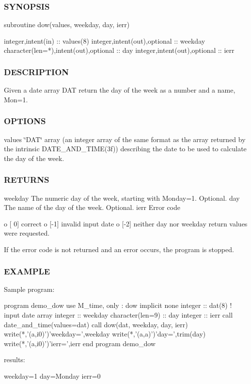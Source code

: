 \subsubsection*{S\+Y\+N\+O\+P\+S\+IS}

\begin{DoxyVerb}subroutine dow(values, weekday, day, ierr)

 integer,intent(in) :: values(8)
 integer,intent(out),optional :: weekday
 character(len=*),intent(out),optional :: day
 integer,intent(out),optional :: ierr
\end{DoxyVerb}


\subsubsection*{D\+E\+S\+C\+R\+I\+P\+T\+I\+ON}

Given a date array D\+AT return the day of the week as a number and a name, Mon=1.

\subsubsection*{O\+P\+T\+I\+O\+NS}

values \char`\"{}\+D\+A\+T\char`\"{} array (an integer array of the same format as the array returned by the intrinsic D\+A\+T\+E\+\_\+\+A\+N\+D\+\_\+\+T\+I\+M\+E(3f)) describing the date to be used to calculate the day of the week. \subsubsection*{R\+E\+T\+U\+R\+NS}

weekday The numeric day of the week, starting with Monday=1. Optional. day The name of the day of the week. Optional. ierr Error code \begin{DoxyVerb}     o [ 0] correct
     o [-1] invalid input date
     o [-2] neither day nor weekday
       return values were requested.

     If the error code is not returned and an error occurs,
     the program is stopped.
\end{DoxyVerb}


\subsubsection*{E\+X\+A\+M\+P\+LE}

\begin{DoxyVerb}Sample program:

 program demo_dow
 use M_time, only : dow
 implicit none
 integer          :: dat(8)     ! input date array
 integer          :: weekday
 character(len=9) :: day
 integer          :: ierr
   call date_and_time(values=dat)
   call dow(dat, weekday, day, ierr)
   write(*,'(a,i0)')'weekday=',weekday
   write(*,'(a,a)')'day=',trim(day)
   write(*,'(a,i0)')'ierr=',ierr
 end program demo_dow

results:

 weekday=1
 day=Monday
 ierr=0
\end{DoxyVerb}
